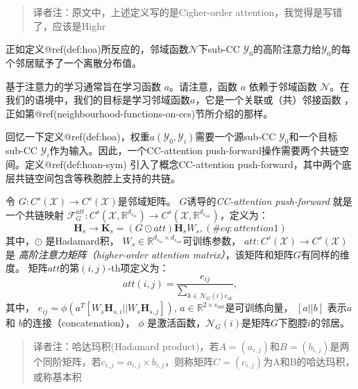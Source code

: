 \documentclass[
  12pt,
]{krantz}
\begin{document}
\begin{quote}
译者注：原文中，上述定义写的是Cigher-order
attention，我觉得是写错了，应该是Highr
\end{quote}

正如定义@ref(def:hoa)所反应的，邻域函数\(\mathcal{N}\)下sub-CC
\(\mathcal{Y}_0\)的高阶注意力给\(\mathcal{Y}_0\)的每个邻居赋予了一个离散分布值。

基于注意力的学习通常旨在学习函数 \(a\)。请注意，函数 \(a\)
依赖于邻域函数
\(\mathcal{N}\)。在我们的语境中，我们的目标是学习邻域函数\(a\)，它是一个关联或（共）邻接函数
，正如第@ref(neighbourhood-functions-on-ccs)节所介绍的那样。

回忆一下定义@ref(def:hoa)，权重\(a(\mathcal{Y}_0,\mathcal{Y}_i)\)需要一个源sub-CC
\(\mathcal{Y}_0\)和一个目标sub-CC
\(\mathcal{Y}_i\)作为输入。因此，一个CC-attention
push-forward操作需要两个共链空间。定义@ref(def:hoan-sym)
引入了概念CC-attention
push-forward，其中两个底层共链空间包含等秩胞腔上支持的共链。

\label{hoan-sym}
令 \(G\colon C^{s}(\mathcal{X})\to C^{s}(\mathcal{X})\)是邻域矩阵。
\(G\)诱导的\emph{CC-attention push-forward} 就是一个共链映射
\(\mathcal{F}^{att}_{G}\colon C^{s}(\mathcal{X}, \mathbb{R}^{d_{s_{in}}}) \to C^{s}(\mathcal{X},\mathbb{R}^{d_{s_{out}}})\)，定义为：
\begin{equation}
\mathbf{H}_s \to \mathbf{K}_{s} = (G \odot att)  \mathbf{H}_{s}  W_{s} ,
(\#eq:attention1)
\end{equation} 其中，\(\odot\) 是Hadamard积，
\(W_{s}  \in \mathbb{R}^{d_{s_{in}}\times d_{s_{out}}}\)可训练参数，
\(att\colon C^{s}(\mathcal{X})\to C^{s}(\mathcal{X})\) 是
\emph{高阶注意力矩阵（higher-order attention
matrix）}，该矩阵和矩阵\(G\)有同样的维度。
矩阵\(att\)的第\((i,j)\)-th项定义为： \begin{equation}
att(i,j) =  \frac{e_{ij}}{ \sum_{k \in \mathcal{N}_{G}(i) e_{ik} } },
\end{equation} 其中，
\(e_{ij}= \phi(a^T [W_{s} \mathbf{H}_{s,i}||W_{s} \mathbf{H}_{s,j} ] )\),
\(a \in \mathbb{R}^{2 \times s_{out}}\)是可训练向量， \([a ||b ]\)
表示\(a\) 和 \(b\)的连接（concatenation）， \(\phi\)
是激活函数，\(\mathcal{N}_{G}(i)\)是矩阵\(G\)下胞腔\(i\)的邻居。

\begin{quote}
译者注：哈达玛积(Hadamard
product)，若\(A=(a_{i,j})\)和\(B=(b_{i,j})\)是两个同阶矩阵，若\(c_{i,j}=a_{i,j}\times b_{i,j}\)，则称矩阵\(C=(c_{i,j})\)为A和B的哈达玛积，或称基本积
\end{quote}
\end{document}
